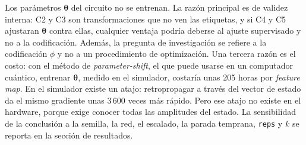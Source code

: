 Los parámetros $\boldsymbol\theta$ del circuito no se entrenan. La razón principal es de validez
interna: C2 y C3 son transformaciones que no ven las etiquetas, y si C4 y C5 ajustaran
$\boldsymbol\theta$ contra ellas, cualquier ventaja podría deberse al ajuste supervisado y no a la
codificación. Además, la pregunta de investigación se refiere a la codificación $\phi$ y no a un
procedimiento de optimización. Una tercera razón es el costo: con el método de
\textit{parameter-shift}, el que puede usarse en un computador cuántico, entrenar $\boldsymbol\theta$, medido en el simulador,
costaría unas 205 horas por \textit{feature map}. En el simulador existe un atajo: retropropagar a
través del vector de estado da el mismo gradiente unas 3\,600 veces más rápido. Pero ese atajo no
existe en el hardware, porque exige conocer todas las amplitudes del estado. La sensibilidad de la
conclusión a la semilla, la red, el escalado, la parada temprana, \texttt{reps} y $k$ se reporta en
la sección de resultados.
